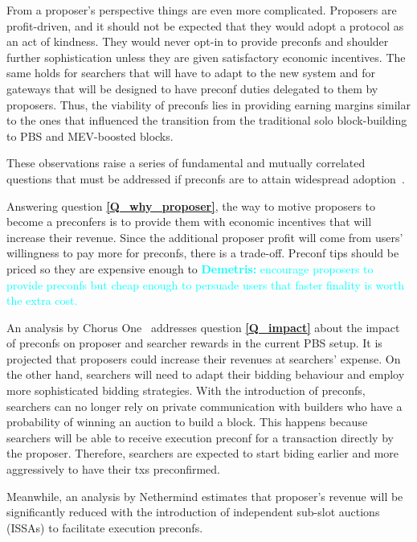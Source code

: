 \documentclass[a4paper]{article}
\theoremstyle{boldstyle}
\newcommand{\dk}[1]{\textcolor{cyan}{\textbf{Demetris:} #1}}
\begin{document}
    From a proposer's perspective things are even more complicated. Proposers are profit-driven, and it should not be expected that they would adopt a protocol as an act of kindness. They would never opt-in to provide preconfs and shoulder further sophistication unless they are given satisfactory economic incentives. The same holds for searchers that will have to adapt to the new system and for gateways that will be designed to have preconf duties delegated to them by proposers. Thus, the viability of preconfs lies in providing earning margins similar to the ones that influenced the transition from the traditional solo block-building to PBS and MEV-boosted blocks.

    These observations raise a series of fundamental and mutually correlated questions that must be addressed if preconfs are to attain widespread adoption~\cite{W:EconomicViabilityofPreconfirmations}. 

    
    Answering question \textbf{\ref{Q_why_proposer}}, the way to motive proposers to become a preconfers is to provide them with economic incentives that will increase their revenue. Since the additional proposer profit will come from users' willingness to pay more for preconfs, there is a trade-off. Preconf tips should be priced so they are expensive enough to \dk{encourage proposers to provide preconfs but cheap enough to persuade users that faster finality is worth the extra cost.   }
 
    An analysis by Chorus One~\cite{W:PreconfirmationsundertheNOlens} addresses question \textbf{\ref{Q_impact}} about the impact of preconfs on proposer and searcher rewards in the current PBS setup. It is projected that proposers could increase their revenues at searchers' expense. On the other hand, searchers will need to adapt their bidding behaviour and employ more sophisticated bidding strategies. With the introduction of preconfs, searchers can no longer rely on private communication with builders who have a probability of winning an auction to build a block. This happens because searchers will be able to receive execution preconf for a transaction directly by the proposer. Therefore, searchers are expected to start biding earlier and more aggressively to have their txs preconfirmed.

    Meanwhile, an analysis by Nethermind \cite{W:EstimatingtheRevenuefromIndependentSub-SlotAuctionPreconfirmations} estimates that proposer's revenue will be significantly reduced with the introduction of independent sub-slot auctions (ISSAs) to facilitate execution preconfs.
        
\end{document}
